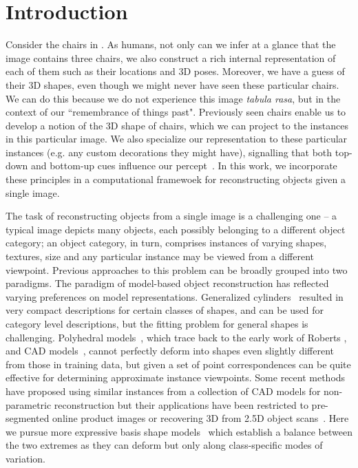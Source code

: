 \section{Introduction}

Consider the chairs in . As humans, not only can we infer at a glance that the image contains three chairs, we also construct a rich internal representation of each of them such as their locations and 3D poses. Moreover, we have a guess of their 3D shapes, even though we might never have seen these particular chairs. We can do this because we do not experience this image {\em tabula rasa}, but in the context of our  ``remembrance of things past".   Previously seen chairs enable us to develop a notion of the 3D shape of chairs, which we can project to the instances in this particular image. We also specialize our representation to these particular instances (e.g. any custom decorations they might have), signalling that both top-down and bottom-up cues influence our percept~\cite{nandakumar2011little}. In this work, we incorporate these principles in a computational framewoek for reconstructing objects given a single image. 

The task of reconstructing objects from a single image is a challenging one -- a typical image depicts many objects, each possibly belonging to a different object category; an object category, in turn, comprises instances of varying shapes, textures, size \etc and any particular instance may be viewed from a different viewpoint. Previous approaches to this problem can be broadly grouped into two paradigms. The paradigm of model-based object reconstruction has reflected varying preferences on model representations.  Generalized cylinders~\cite{nevatia1977description} resulted in very compact descriptions for certain classes of shapes, and can be used for category level descriptions, but the fitting problem for general shapes is challenging. Polyhedral models~\cite{gupta2010blocks,xiao2012localizing}, which trace back to the early work of Roberts \cite{roberts1963machine}, and CAD models~\cite{limparsing,satkin20143dnn,Pepik_2015_CVPR_Workshops}, cannot perfectly deform into shapes even slightly different from those in training data, but given a set of point correspondences can be quite effective for determining approximate instance viewpoints. Some recent methods have proposed using similar instances from a collection of CAD models \cite{su2014estimating,huang2015single} for  non-parametric reconstruction but their applications have been restricted to pre-segmented online product images or recovering 3D from 2.5D object scans~\cite{sung2015data}. Here we pursue more expressive basis shape models~\cite{Anguelov:SCAPE2005,blanz1999morphable,zia2013detailed} which establish a balance between the two extremes as they can deform but only along class-specific modes of variation.

